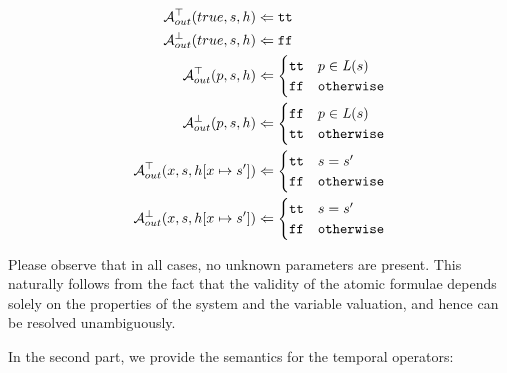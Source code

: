 \begin{align*}
	\mathcal{A}^\top_{out}(true, s, h) & \Leftarrow \texttt{tt} \\
	\mathcal{A}^\bot_{out}(true, s, h) & \Leftarrow \texttt{ff} \\
	\mathcal{A}^\top_{out}(p, s, h) & \Leftarrow 
	\begin{cases}
		\texttt{tt} & p \in \mathit{L}(s) \\
		\texttt{ff} & \texttt{otherwise} \\
	\end{cases}
	\\
	\mathcal{A}^\bot_{out}(p, s, h) & \Leftarrow 
	\begin{cases}
		\texttt{ff} & p \in \mathit{L}(s) \\
		\texttt{tt} & \texttt{otherwise} \\
	\end{cases}
	\\
	\mathcal{A}^\top_{out}(x, s, h[ x \mapsto s' ]) & \Leftarrow
	\begin{cases}
		\texttt{tt} & s = s' \\
		\texttt{ff} & \texttt{otherwise}
	\end{cases}
	\\
	\mathcal{A}^\bot_{out}(x, s, h[ x \mapsto s']) & \Leftarrow
	\begin{cases}
		\texttt{tt} & s = s' \\
		\texttt{ff} & \texttt{otherwise}
	\end{cases}
	\\
\end{align*}

Please observe that in all cases, no unknown parameters are present. This naturally follows from the fact that the validity of the atomic formulae depends solely on the properties of the system and the variable valuation, and hence can be resolved unambiguously.

In the second part, we provide the semantics for the temporal operators:



